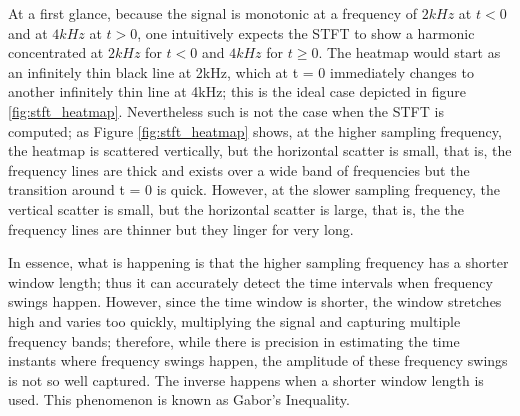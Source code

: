 	At a first glance, because the signal is monotonic at a frequency of $2kHz$ at $t<0$ and at $4kHz$ at $t > 0$, one intuitively expects the STFT to show a harmonic concentrated at $2kHz$ for $t<0$ and $4kHz$ for $t\geq 0$. The heatmap would start as an infinitely thin black line at 2kHz, which at t = 0 immediately changes to another infinitely thin line at 4kHz; this is the ideal case depicted in figure \ref{fig:stft_heatmap}. Nevertheless such is not the case when the STFT is computed; as Figure \ref{fig:stft_heatmap} shows, at the higher sampling frequency, the heatmap is scattered vertically, but the horizontal scatter is small, that is, the frequency lines are thick and exists over a wide band of frequencies but the transition around t = 0 is quick. However, at the slower sampling frequency, the vertical scatter is small, but the horizontal scatter is large, that is, the the frequency lines are thinner but they linger for very long.

	In essence, what is happening is that the higher sampling frequency has a shorter window length; thus it can accurately detect the time intervals when frequency swings happen. However, since the time window is shorter, the window stretches high and varies too quickly, multiplying the signal and capturing multiple frequency bands; therefore, while there is precision in estimating the time instants where frequency swings happen, the amplitude of these frequency swings is not so well captured. The inverse happens when a shorter window length is used. This phenomenon is known as Gabor's Inequality.

